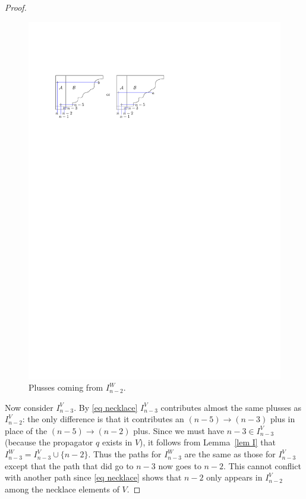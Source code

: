 \documentclass[11pt]{article}
\theoremstyle{remark}
\theoremstyle{definition}
\begin{document}
\begin{proof}
  \begin{figure}
     \includegraphics{messyD}
    \caption{Plusses coming from $I_{n-2}^{W}$.}\label{fig messyD}
  \end{figure}

Now consider $I_{n-3}^{V}$.  By \eqref{eq necklace} $I_{n-3}^{V}$ contributes almost the same plusses as $I_{n-2}^{V}$: the only difference is that it contributes an $(n-5)\rightarrow (n-3)$ plus in place of the $(n-5)\rightarrow (n-2)$ plus.  Since we must have $n-3\in I_{n-3}^{V}$ (because the propagator $q$ exists in $V$), it follows from Lemma~\ref{lem I} that $I_{n-3}^{W} = I_{n-3}^{V}\cup\{n-2\}$.  Thus the paths for $I^{W}_{n-3}$ are the same as those for $I^{V}_{n-3}$ except that the path that did go to $n-3$ now goes to $n-2$.  This cannot conflict with another path since \eqref{eq necklace} shows that $n-2$ only appears in $I_{n-2}^{V}$ among the necklace elements of $V$.


\end{proof}
\end{document}
